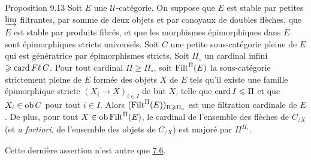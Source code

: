 \documentclass[10pt]{../fichiers-configuration-latex/smfart}
\begin{document}
\begin{enonce*}{Proposition 9.13}
Soit $E$ une $𝒰$-catégorie. On suppose que $E$ est stable
par petites $\varinjlim$ filtrantes, par somme de deux objets et par
conoyaux de doubles flèches, que $E$ est stable par produits fibrés,
et que les morphismes épimorphiques dans $E$ sont épimorphiques
stricts universels. Soit $C$ une petite sous-catégorie pleine de $E$
qui est génératrice par épimorphismes stricts. Soit $\Pi_\circ$ un
cardinal infini $\geqslant \operatorname{card} F\ell\,  C$. Pour tout cardinal $\Pi\geq
\Pi_\circ$, soit $\operatorname{Filt}^{\Pi}(E)$ la sous-catégorie strictement
pleine de $E$ formée des objets $X$ de $E$ tels qu'il existe une
famille épimorphique stricte $(X_i\rightarrow X)_{i \in I}$ de but
$X$, telle que $\operatorname{card} I\leqslant \Pi$ et que $X_i\in \operatorname{ob} C$ pour tout
$i\in I$. Alors $(\operatorname{Filt}^{\Pi}(E))_{\Pi\geqslant \Pi_\circ}$ est une
filtration cardinale de $E$. De plus, pour tout $X\in \operatorname{ob}
\operatorname{Filt}^{\Pi}(E)$, le cardinal de l'ensemble des flèches de $C_{/X}$
(et \textit{a fortiori}, de l'ensemble des objets de $C_{/X}$) est
majoré par $\Pi^{\Pi_\circ}$.
\end{enonce*}

Cette dernière assertion n'est autre que \hyperref[I.prop7.6]{7.6}.
\end{document}
